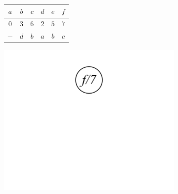 \documentclass[11pt,a4paper]{article}
\begin{document}
\begin{loesung}
\begin{enumerate}
\begin{figure}[h!]
\begin{subfigure}{0.3\textwidth}
                \centering
                \begin{tabular}{|c|c|c|c|c|c|}
                    \hline
                    $a$ & $b$ & $c$ & $d$ & $e$ & $f$ \\
                    \hline
                    $0$ & $3$ & $6$ & $2$ & $5$ & $7$ \\
                    \hline
                    $-$ & $d$ & $b$ & $a$ & $b$ & $c$ \\
                    \hline
                \end{tabular}
            \end{subfigure}
            \begin{subfigure}{0.3\textwidth}
                \centering
                \includegraphics[width=\textwidth]{img/3b_6.png}
            \end{subfigure}
        \end{figure}
        \FloatBarrier
        

\end{enumerate}
\end{loesung}
\end{document}
